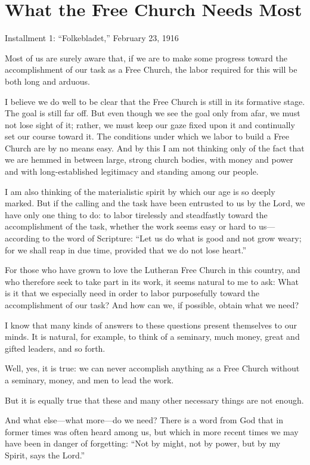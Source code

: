 
\section{What the Free Church Needs Most}

Installment 1: “Folkebladet,” February 23, 1916

Most of us are surely aware that, if we are to make some progress toward the accomplishment of our task as a Free Church, the labor required for this will be both long and arduous.

I believe we do well to be clear that the Free Church is still in its formative stage. The goal is still far off. But even though we see the goal only from afar, we must not lose sight of it; rather, we must keep our gaze fixed upon it and continually set our course toward it. The conditions under which we labor to build a Free Church are by no means easy. And by this I am not thinking only of the fact that we are hemmed in between large, strong church bodies, with money and power and with long-established legitimacy and standing among our people.

I am also thinking of the materialistic spirit by which our age is so deeply marked. But if the calling and the task have been entrusted to us by the Lord, we have only one thing to do: to labor tirelessly and steadfastly toward the accomplishment of the task, whether the work seems easy or hard to us—according to the word of Scripture: “Let us do what is good and not grow weary; for we shall reap in due time, provided that we do not lose heart.”

For those who have grown to love the Lutheran Free Church in this country, and who therefore seek to take part in its work, it seems natural to me to ask: What is it that we especially need in order to labor purposefully toward the accomplishment of our task? And how can we, if possible, obtain what we need?

I know that many kinds of answers to these questions present themselves to our minds. It is natural, for example, to think of a seminary, much money, great and gifted leaders, and so forth.

Well, yes, it is true: we can never accomplish anything as a Free Church without a seminary, money, and men to lead the work.

But it is equally true that these and many other necessary things are not enough.

And what else—what more—do we need? There is a word from God that in former times was often heard among us, but which in more recent times we may have been in danger of forgetting: “Not by might, not by power, but by my Spirit, says the Lord.”

